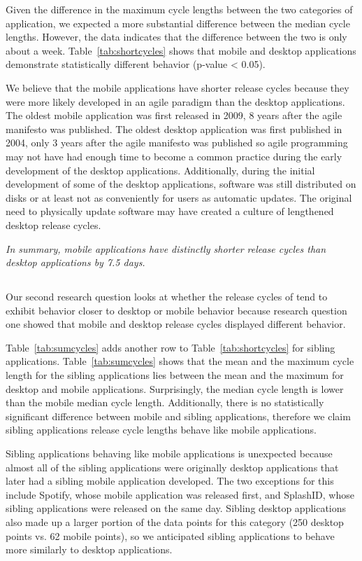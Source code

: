 \documentclass{acm_proc_article-sp}
\begin{document}
Given the difference in the maximum cycle lengths between the two categories of application, we expected a more substantial difference between the median cycle lengths.
However, the data indicates that the difference between the two is only about a week.
Table~\ref{tab:shortcycles} shows that mobile and desktop applications demonstrate statistically different behavior (p-value < 0.05).

We believe that the mobile applications have shorter release cycles because they were more likely developed in an agile paradigm than the desktop applications. 
The oldest mobile application was first released in 2009, 8 years after the agile manifesto was published. 
The oldest desktop application was first published in 2004, only 3 years after the agile manifesto was published so agile programming may not have had enough time to become a common practice during the early development of the desktop applications.
Additionally, during the initial development of some of the desktop applications, software was still distributed on disks or at least not as conveniently for users as automatic updates. 
The original need to physically update software may have created a culture of lengthened desktop release cycles.



\textit{In summary, mobile applications have distinctly shorter release cycles than desktop applications by 7.5 days.}


\subsection{\RQTwo }
Our second research question looks at whether the release cycles of \sibs tend to exhibit behavior closer to desktop or mobile behavior because research question one showed that mobile and desktop release cycles displayed different behavior.

Table~\ref{tab:sumcycles} adds another row to Table~\ref{tab:shortcycles} for sibling applications. 
Table~\ref{tab:sumcycles} shows that the mean and the maximum cycle length for the sibling applications lies between the mean and the maximum for desktop and mobile applications. 
Surprisingly, the median cycle length is lower than the mobile median cycle length. 
Additionally, there is no statistically significant difference between mobile and sibling applications, therefore we claim sibling applications release cycle lengths behave like mobile applications.


Sibling applications behaving like mobile applications is unexpected because almost all of the sibling applications were originally desktop applications that later had a sibling mobile application developed.
The two exceptions for this include Spotify, whose mobile application was released first, and SplashID, whose sibling applications were released on the same day.
Sibling desktop applications also made up a larger portion of the data points for this category (250 desktop points vs. 62 mobile points), so we anticipated sibling applications to behave more similarly to desktop applications.
\end{document}
